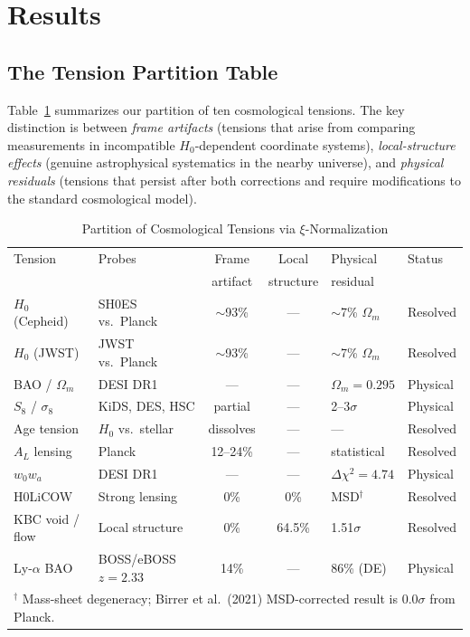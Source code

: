 \documentclass[twocolumn]{aastex631}
\begin{document}

\section{Results}

\subsection{The Tension Partition Table}

Table~\ref{tab:tensions} summarizes our partition of ten cosmological tensions.
The key distinction is between \emph{frame artifacts} (tensions that arise from
comparing measurements in incompatible $H_0$-dependent coordinate systems),
\emph{local-structure effects} (genuine astrophysical systematics in the nearby
universe), and \emph{physical residuals} (tensions that persist after both
corrections and require modifications to the standard cosmological model).

\begin{table}
\centering
\caption{Partition of Cosmological Tensions via $\xi$-Normalization}
\label{tab:tensions}
\begin{tabular}{llccll}
\toprule
Tension & Probes & Frame & Local & Physical & Status \\
        &        & artifact & structure & residual & \\
\midrule
$H_0$ (Cepheid) & SH0ES vs.\ Planck & $\sim$93\% & --- & $\sim$7\% $\Omega_m$ & Resolved \\
$H_0$ (JWST)    & JWST vs.\ Planck  & $\sim$93\% & --- & $\sim$7\% $\Omega_m$ & Resolved \\
BAO / $\Omega_m$ & DESI DR1          & --- & --- & $\Omega_m = 0.295$ & Physical \\
$S_8$ / $\sigma_8$ & KiDS, DES, HSC  & partial & --- & 2--3$\sigma$ & Physical \\
Age tension      & $H_0$ vs.\ stellar & dissolves & --- & --- & Resolved \\
$A_L$ lensing    & Planck            & 12--24\% & --- & statistical & Resolved \\
$w_0 w_a$        & DESI DR1          & --- & --- & $\Delta\chi^2=4.74$ & Physical \\
H0LiCOW         & Strong lensing    & 0\% & 0\% & MSD$^\dagger$ & Resolved \\
KBC void / flow  & Local structure   & 0\% & 64.5\% & 1.51$\sigma$ & Resolved \\
Ly-$\alpha$ BAO  & BOSS/eBOSS $z=2.33$ & 14\% & --- & 86\% (DE) & Physical \\
\bottomrule
\multicolumn{6}{l}{$^\dagger$ Mass-sheet degeneracy; Birrer et al.\ (2021) MSD-corrected result is 0.0$\sigma$ from Planck.}
\end{tabular}
\end{table}
\end{document}
